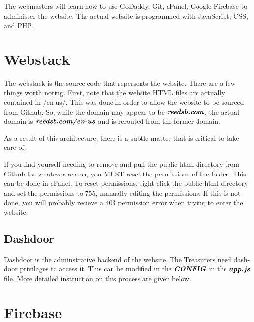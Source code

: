 \documentclass[a4paper]{article}
\begin{document}
\medskip
{}

The webmasters will learn how to use GoDaddy, Git, cPanel, Google Firebase to administer the website. The actual website is programmed with JavaScript, CSS, and PHP. \newline

\newpage
\section{Webstack}

The webstack is the source code that repersents the website. There are a few things worth noting. First, note that the website HTML files are actually contained in /en-us/. This was done in order to allow the website to be sourced from Github. So, while the domain may appear to be $\textbf{\textit{reedsb.com}}$, the actual domain is $\textbf{\textit{reedsb.com/en-us}}$ and is rerouted from the former domain.

As a result of this architecture, there is a subtle matter that is critical to take care of.

\begin{warning*}
If you find yourself needing to remove and pull the public-html directory from Github for whatever reason, you MUST reset the permissions of the folder. This can be done in cPanel. To reset permissions, right-click the public-html directory and set the permissions to 755, manually editing the permissions. If this is not done, you will probably recieve a 403 permission error when trying to enter the website.
\end{warning*}

\subsection{Dashdoor}
Dashdoor is the adminstrative backend of the website. The Treasurers need dash-door privilages to access it. This can be modified in the $\textbf{\textit{CONFIG}}$ in the $\textbf{\textit{app.js}}$ file. More detailed instruction on this process are given below.


\newpage
\section{Firebase}
\end{document}
